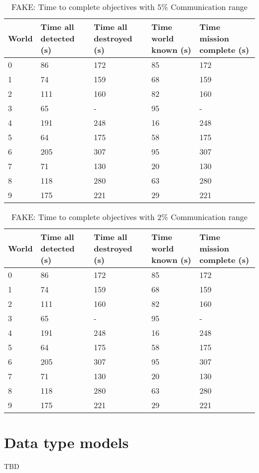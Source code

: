 \begin{table}[h]
	\caption{FAKE: Time to complete objectives with 5\% Communication range}
	\centering
	\label{tab:comm5}
	
	\begin{tabular}{|p{1cm}|p{1.5cm}|p{1.75cm}|p{1.5cm}|p{1.5cm}|}
		\hline
		World & Time all detected (s) & Time all destroyed (s) & Time world known (s) & Time mission complete (s) \\
		\hline
		0&	 86 & \cellcolor{red}172 & 85 & 172 \\ \hline
		1&	 74 & \cellcolor{red}159 & 68 & 159 \\ \hline
		2&	111 & \cellcolor{red}160 & 82 & 160 \\ \hline
		3&	 65 & -                  & 95 &	-  \\ \hline
		4&	191 & \cellcolor{red}248 & 16 & 248 \\ \hline
		5&	 64 & \cellcolor{red}175 & 58 & 175 \\ \hline
		6&	205 & \cellcolor{red}307 & 95 & 307 \\ \hline
		7&	 71 & \cellcolor{red}130 & 20 & 130 \\ \hline
		8&	118 & \cellcolor{red}280 & 63 & 280 \\ \hline
		9&	175 & \cellcolor{red}221 & 29 & 221 \\ \hline
	\end{tabular}
\end{table}


\begin{table}[h]
	\caption{FAKE: Time to complete objectives with 2\% Communication range}
	\centering
	\label{tab:comm2}
	
	\begin{tabular}{|p{1cm}|p{1.5cm}|p{1.75cm}|p{1.5cm}|p{1.5cm}|}
		\hline
		World & Time all detected (s) & Time all destroyed (s) & Time world known (s) & Time mission complete (s) \\
		\hline
		0&	 86 & \cellcolor{red}172 & 85 & 172 \\ \hline
		1&	 74 & \cellcolor{red}159 & 68 & 159 \\ \hline
		2&	111 & \cellcolor{red}160 & 82 & 160 \\ \hline
		3&	 65 & -                  & 95 &	-  \\ \hline
		4&	191 & \cellcolor{red}248 & 16 & 248 \\ \hline
		5&	 64 & \cellcolor{red}175 & 58 & 175 \\ \hline
		6&	205 & \cellcolor{red}307 & 95 & 307 \\ \hline
		7&	 71 & \cellcolor{red}130 & 20 & 130 \\ \hline
		8&	118 & \cellcolor{red}280 & 63 & 280 \\ \hline
		9&	175 & \cellcolor{red}221 & 29 & 221 \\ \hline
	\end{tabular}
\end{table}

\section{Data type models}
TBD
